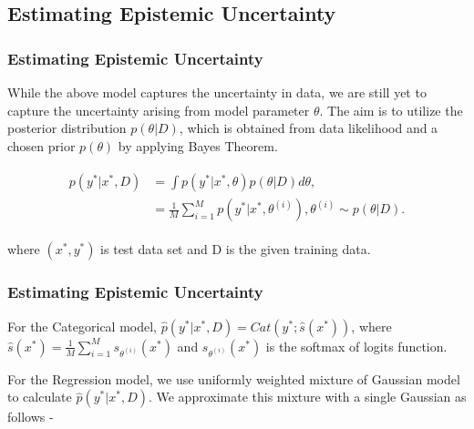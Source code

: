 \documentclass{beamer}
\begin{document}
\subsection{Estimating Epistemic Uncertainty}
\begin{frame}
\frametitle{Estimating Epistemic Uncertainty}

While the above model captures the uncertainty in data, we are still yet to capture the uncertainty arising from model parameter $\theta$. The aim is to utilize the posterior distribution $p(\theta | D)$, which is obtained from data likelihood and a chosen prior $p(\theta)$ by applying Bayes Theorem. 

\begin{align}
\begin{split}
 p(y^*|x^*, D) &= \int p(y^*|x^*, \theta) p(\theta | D) d\theta ,
\\
  &= \frac{1}{M} \sum_{i=1}^{M} p(y^*| x^*, \theta^{(i)}), \theta^{(i)} \sim p(\theta | D) .
\end{split}
\end{align}

where $(x^*, y^*)$ is test data set and D is the given training data.

\end{frame}





\begin{frame}
\frametitle{Estimating Epistemic Uncertainty}

\hspace{0.3cm} For the Categorical model, $\hat{p}(y^* | x^*, D) = Cat(y^*; \hat{s}(x^*))$, where $\hat{s}(x^*) = \frac{1}{M} \sum_{i=1}^{M} s_{\theta^{(i)}} (x^*)$ and $s_{\theta^{(i)}} (x^*)$ is the softmax of logits function.
\vspace{0.3cm}

\hspace{0.3cm} For the Regression model, we use uniformly weighted mixture of Gaussian model to calculate $\hat{p}(y^* | x^*, D)$. We approximate this mixture with a single Gaussian as follows - 

\end{frame}
\end{document}
